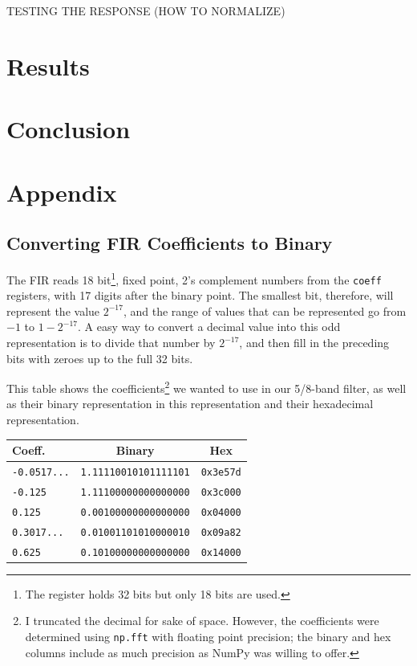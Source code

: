 \documentclass[12pt]{article}
\begin{document}
TESTING THE RESPONSE (HOW TO NORMALIZE)

\section*{Results}

\section*{Conclusion}

\section*{Appendix}
\subsection*{Converting FIR Coefficients to Binary}
The FIR reads 18 bit\footnote{The register holds 32 bits but only 18 bits are used.}, fixed point, 2's complement numbers from the \texttt{coeff} registers, with 17 digits after the binary point. The smallest bit, therefore, will represent the value $2^{-17}$, and the range of values that can be represented go from $-1$ to $1-2^{-17}$. A easy way to convert a decimal value into this odd representation is to divide that number by $2^{-17}$, and then fill in the preceding bits with zeroes up to the full 32 bits.

This table shows the coefficients\footnote{I truncated the decimal for sake of space. However, the coefficients were determined using \texttt{np.fft} with floating point precision; the binary and hex columns include as much precision as NumPy was willing to offer.} we wanted to use in our 5/8-band filter, as well as their binary representation in this representation and their hexadecimal representation.

\begin{center}
  \begin{tabular}{ l | c | c }
    Coeff. & Binary & Hex\\ \hline
    \texttt{-0.0517...}  &  \texttt{1.11110010101111101} & \texttt{0x3e57d}\\
    \texttt{-0.125} &  \texttt{1.11100000000000000} & \texttt{0x3c000}\\
    \texttt{0.125} & \texttt{0.00100000000000000} & \texttt{0x04000}\\
    \texttt{0.3017...} &  \texttt{0.01001101010000010} & \texttt{0x09a82}\\
    \texttt{0.625} &  \texttt{0.10100000000000000} & \texttt{0x14000}\\
   \end{tabular}
\end{center}
\end{document}
